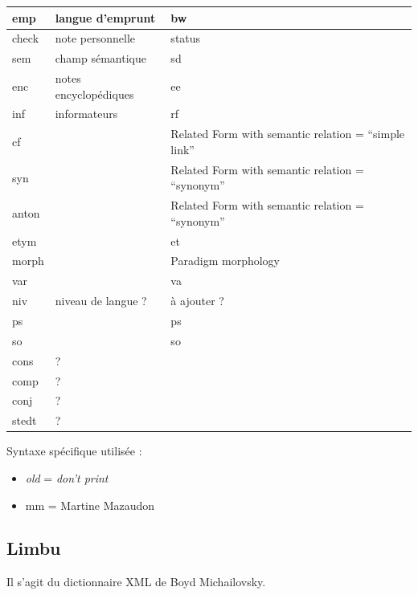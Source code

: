 \documentclass[a4paper,12pt]{article}
\begin{document}
\begin{center}
\begin{longtable}{|p{4cm}|p{5cm}|p{6cm}|}
emp & langue d’emprunt & bw \\ \hline
check & note personnelle & status \\ \hline
sem & champ sémantique & sd \\ \hline
enc & notes encyclopédiques & ee \\ \hline
inf & informateurs & rf \\ \hline
cf & & Related Form with semantic relation = ``simple link'' \\ \hline
syn & & Related Form with semantic relation = ``synonym'' \\ \hline
anton & & Related Form with semantic relation = ``synonym'' \\ \hline
etym & & et \\ \hline
morph & & Paradigm morphology \\ \hline
var & & va \\ \hline
niv & niveau de langue ? & à ajouter ? \\ \hline
ps & & ps \\ \hline
so & & so \\ \hline
cons & ? & \\ \hline
comp & ? & \\ \hline
conj & ? & \\ \hline
stedt & ? & \\ \hline
\end{longtable}
\end{center}

Syntaxe spécifique utilisée :
\begin{itemize}
\item \textit{old} = \textit{don’t print}
\item mm = Martine Mazaudon
\end{itemize}

\pagebreak

\subsection{Limbu}

Il s'agit du dictionnaire XML de Boyd Michailovsky.
\end{document}
